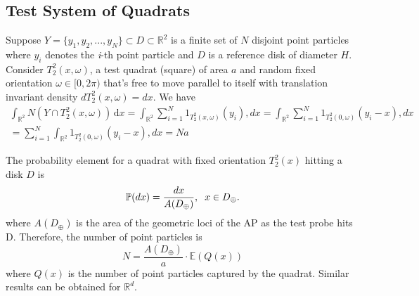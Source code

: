 \subsection{Test System of Quadrats}
Suppose $Y=\{ y_1,y_2,...,y_N \}\subset D \subset \mathbb{R}^2$ is a finite set of $N$ disjoint point particles where $y_i$ denotes the \textit{i}-th point particle and $D$ is a reference disk of diameter $H$. Consider $T_2^2(x,\omega)$, a test quadrat (square) of area $a$ and random fixed orientation $\omega \in [0,2\pi)$ that's free to move parallel to itself with translation invariant density $dT_2^2(x,\omega)=dx$. We have
\begin{multline} \label{eq3}
    \int_{\mathbb{R}^2}  N(Y\cap T_2^2(x,\omega))\,\mathrm{d}x = \int_{\mathbb{R}^2} \sum_{i=1}^N 1_{T_2^2(x,\omega)}(y_i),dx = \int_{\mathbb{R}^2} \sum_{i=1}^N 1_{T_2^2(0,\omega)}(y_i-x),dx \\ = \sum_{i=1}^N \int_{\mathbb{R}^2}  1_{T_2^2(0,\omega)}(y_i-x),dx = Na 
\end{multline}

The probability element for a quadrat with fixed orientation $T_2^2(x)$ hitting a disk $D$ is
\begin{equation*}
    \mathbb{P}(dx)=\frac{dx}{A(D_{\oplus})}, \hspace{2mm} x\in D_{\oplus}.
\end{equation*}
where $A(D_{\oplus})$ is the area of the geometric loci of the AP as the test probe hits D. Therefore, the number of point particles is
\begin{equation*}
    N=\frac{A(D_{\oplus})}{a}\cdot\mathbb{E}(Q(x))
\end{equation*}
where $Q(x)$ is the number of point particles captured by the quadrat. Similar results can be obtained for $\mathbb{R}^d$.\\

